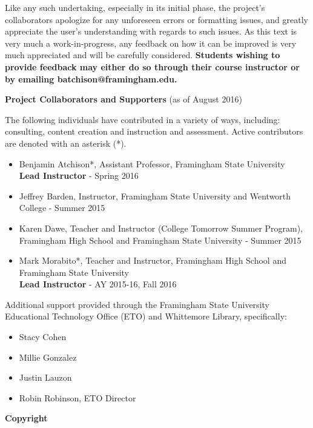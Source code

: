 \indent Like any such undertaking, especially in its initial phase, the project's collaborators apologize for any unforeseen errors or formatting issues, and greatly appreciate the user's understanding with regards to such issues.  As this text is very much a work-in-progress, any feedback on how it can be improved is very much appreciated and will be carefully considered.\pp
{\bf Students wishing to provide feedback may either do so through their course instructor or by emailing {\small batchison@framingham.edu}.}   
\par
\begin{center}\textbf{Project Collaborators and Supporters} (as of August 2016) \end{center}\par
\noindent The following individuals have contributed in a variety of ways, including: consulting, content creation and instruction and assessment.  Active contributors are denoted with an asterisk (*).
\begin{itemize}
	\item Benjamin Atchison*, Assistant Professor, Framingham State University\\{\bf Lead Instructor} - Spring 2016
	\item Jeffrey Barden, Instructor, Framingham State University and Wentworth College - Summer 2015
	\item Karen Dawe, Teacher and Instructor (College Tomorrow Summer Program), Framingham High School and Framingham State University - Summer 2015
	\item Mark Morabito*, Teacher and Instructor, Framingham High School and Framingham State University\\{\bf Lead Instructor} - AY 2015-16, Fall 2016
\end{itemize}
\pagebreak
Additional support provided through the Framingham State University Educational Technology Office (ETO) and Whittemore Library, specifically:
\begin{itemize}
	\item Stacy Cohen
	\item Millie Gonzalez
	\item Justin Lauzon
	\item Robin Robinson, ETO Director
\end{itemize}\par
\begin{center}\textbf{Copyright} \end{center}%
\doclicenseThis

